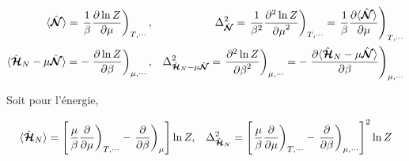 	

	
\begin{eqnarray}
	\langle \hat{\bm{\mathcal{N}}} \rangle  = \left .\frac{1}{\beta} \frac{ \partial \ln Z}{\partial \mu } \right )_{T,\cdots},  & & \Delta^2_{\hat{\bm{\mathcal{N}}}} = \left . \frac{1}{\beta^2} \frac{ \partial^2 \ln Z}{{\partial \mu}^2 } \right )_{T,\cdots} =  \left . \frac{1}{\beta} \frac{ \partial \langle \hat{\bm{\mathcal{N}}} \rangle}{\partial \mu } \right )_{T,\cdots}\\
	\langle \hat{\bm{\mathcal{H}}}_N - \mu\hat{\bm{\mathcal{N}}}  \rangle  = -\left . \frac{ \partial \ln Z}{\partial \beta } \right )_{\mu , \cdots} ,  & & \Delta^2_{\hat{\bm{\mathcal{H}}}_N - \mu\hat{\bm{\mathcal{N}}}} = \left .  \frac{ \partial^2 \ln Z}{{\partial \beta}^2 } \right )_{\mu , \cdots} =  -\left .  \frac{ \partial \langle \hat{\bm{\mathcal{H}}}_N - \mu\hat{\bm{\mathcal{N}}} \rangle}{\partial \beta } \right )_{\mu , \cdots}		
\end{eqnarray}

Soit pour l'énergie, 

\begin{eqnarray}
	\langle \hat{\bm{\mathcal{H}}}_N \rangle  = \left [ \left .\frac{\mu}{\beta} \frac{ \partial}{\partial \mu } \right )_{T,\cdots} -\left . \frac{ \partial }{\partial \beta } \right )_\mu  \right ]\ln Z,  & & \Delta^2_{\hat{\bm{\mathcal{H}}}_N } = \left [ \left .\frac{\mu}{\beta} \frac{ \partial}{\partial \mu } \right )_{T,\cdots} -\left . \frac{ \partial }{\partial \beta } \right )_{\mu,\cdots}  \right ]^2\ln Z		
\end{eqnarray}


	
	
